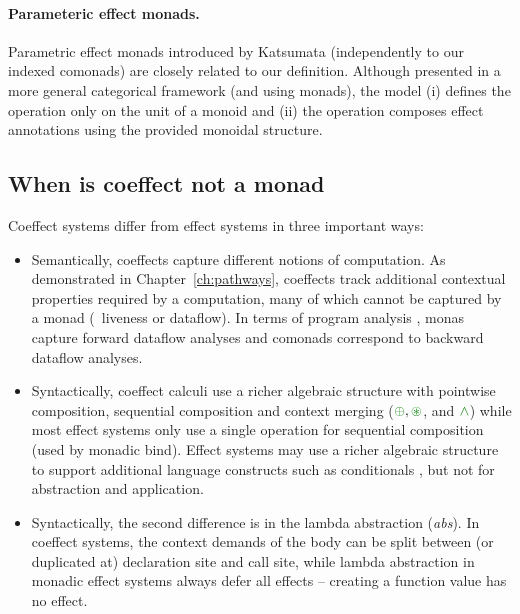 \paragraph{Parameteric effect monads.}
Parametric effect monads introduced by Katsumata \cite{monads-parametric} (independently to our
indexed comonads) are closely related to our definition.  Although presented in a more general
categorical framework (and using monads), the model (i) defines the  operation only on the
unit of a monoid and (ii) the  operation composes effect annotations using the provided
monoidal structure.

\subsection{When is coeffect not a monad}
\label{sec:semantics-related-monad}

Coeffect systems differ from effect systems in three important ways:

\begin{itemize}
\item Semantically, coeffects capture different notions of computation. As demonstrated in
  Chapter~\ref{ch:pathways}, coeffects track additional contextual properties required by a
  computation, many of which cannot be captured by a monad (\eg~liveness or dataflow).
  In terms of program analysis \cite{other-optcomp}, monas capture forward dataflow analyses and
  comonads correspond to backward dataflow analyses.

\item Syntactically, coeffect calculi use a richer algebraic structure with pointwise composition,
  sequential composition and context merging ($\cpar, \cseq$, and $\czip$) while most effect systems
  only use a single operation for sequential composition (used by monadic bind). Effect systems
  may use a richer algebraic structure to support additional language constructs such as conditionals
  \cite{effects-nielson,effects-revisited}, but not for abstraction and application.

\item Syntactically, the second difference is in the lambda abstraction (\emph{abs}). In
  coeffect systems, the context demands of the body can be split between (or duplicated
  at) declaration site and call site, while lambda abstraction in monadic effect systems always
  defer all effects -- creating a function value has no effect.
\end{itemize}

